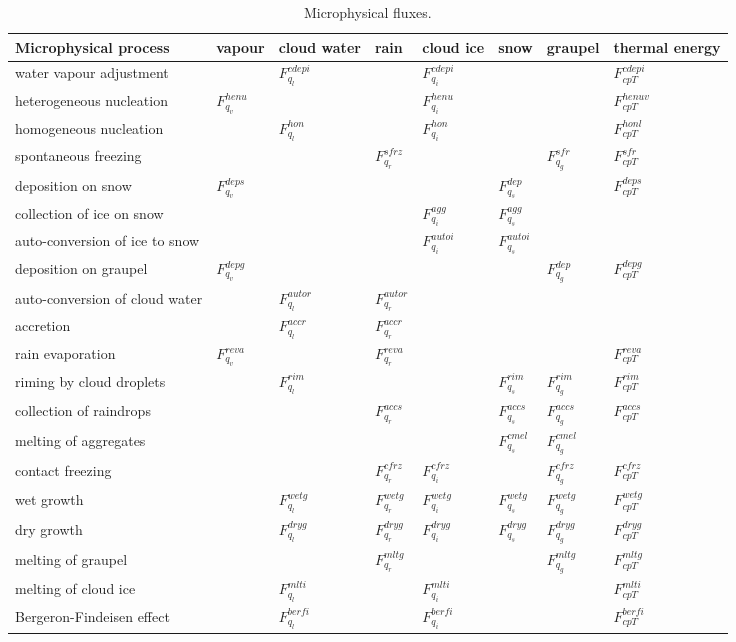 \begin{table}[!hbtp]
\label{tmpf}
  \begin{tabular}{|p{4 cm}||p{0.9 cm}|p{0.8 cm}|p{0.7 cm}|p{0.7 cm}|p{0.7 cm}|p{0.9 cm}|p{1.1 cm}|}

\hline
Microphysical process           &vapour&cloud water&rain&cloud ice&snow& graupel&thermal energy\\
\hline
\hline						
water vapour adjustment	        &&$F_{q_l}^{cdepi}$&&$F_{q_i}^{cdepi}$&&&$F_{cp T}^{cdepi}$\\
\hline
heterogeneous nucleation        &$F_{q_v}^{henu}$&&&$F_{q_i}^{henu}$&&&$F_{cp T}^{henuv}$\\
\hline
homogeneous nucleation	        &&$F_{q_l}^{hon}$&&$F_{q_i}^{hon}$&&&$F_{cp T}^{honl}$\\
\hline
spontaneous freezing	        &&&$F_{q_r}^{sfrz}$&&&$F_{q_g}^{sfr}$&$F_{cp T}^{sfr}$\\
\hline
deposition on snow	        &$F_{q_v}^{deps}$&&&&$F_{q_s}^{dep}$&&$F_{cp T}^{deps}$\\
\hline
collection of ice on snow       &&&&$F_{q_i}^{agg}$&$F_{q_s}^{agg}$&&\\
\hline
auto-conversion of ice to snow	&&&&$F_{q_i}^{autoi}$&$F_{q_s}^{autoi}$&&\\
\hline
deposition on graupel	        &$F_{q_v}^{depg}$&&&&&$F_{q_g}^{dep}$&$F_{cp T}^{depg}$\\
\hline
auto-conversion of cloud water  &&$F_{q_l}^{autor}$&$F_{q_r}^{autor}$&&&&\\
\hline
accretion	 	 	&&$F_{q_l}^{accr}$&$F_{q_r}^{accr}$&&&&\\
\hline
rain evaporation	 	&$F_{q_v}^{reva}$&&$F_{q_r}^{reva}$&&&&$F_{cp T}^{reva}$\\
\hline
riming by cloud droplets	&&$F_{q_l}^{rim}$&&&$F_{q_s}^{rim}$&$F_{q_g}^{rim}$&$F_{cp T}^{rim}$\\
\hline
collection of raindrops	 	&&&$F_{q_r}^{accs}$&&$F_{q_s}^{accs}$&$F_{q_g}^{accs}$&$F_{cp T}^{accs}$\\
\hline
melting of aggregates	 	&&&&&$F_{q_s}^{cmel}$&$F_{q_g}^{cmel}$&\\
\hline
contact freezing	 	&&&$F_{q_r}^{cfrz}$&$F_{q_i}^{cfrz}$&&$F_{q_g}^{cfrz}$&$F_{cp T}^{cfrz}$\\
\hline
wet growth &&$F_{q_l}^{wetg}$&$F_{q_r}^{wetg}$&$F_{q_i}^{wetg}$&$F_{q_s}^{wetg}$&$F_{q_g}^{wetg}$&$F_{cp T}^{wetg}$\\
\hline
dry growth &&$F_{q_l}^{dryg}$&$F_{q_r}^{dryg}$&$F_{q_i}^{dryg}$&$F_{q_s}^{dryg}$&$F_{q_g}^{dryg}$&$F_{cp T}^{dryg}$\\
\hline
melting of graupel	 	&&&$F_{q_r}^{mltg}$&&&$F_{q_g}^{mltg}$&$F_{cp T}^{mltg}$\\
\hline
melting of cloud ice	        &&$F_{q_l}^{mlti}$&&$F_{q_i}^{mlti}$&&&$F_{cp T}^{mlti}$\\
\hline
Bergeron-Findeisen effect	&&$F_{q_l}^{berfi}$&&$F_{q_i}^{berfi}$&&&$F_{cp T}^{berfi}$\\
\hline

  \end{tabular}
       \caption{Microphysical fluxes.}
      \label{MiFlux}
\end{table}

